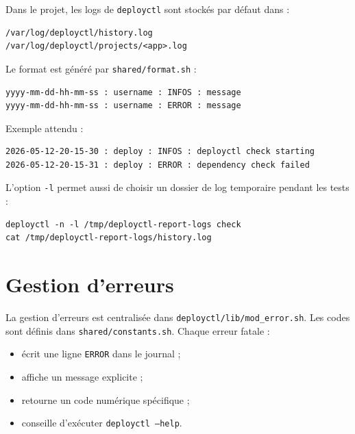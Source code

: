 \documentclass[12pt,a4paper]{article}
\begin{document}
Dans le projet, les logs de \texttt{deployctl} sont stockés par défaut dans :

\begin{lstlisting}
/var/log/deployctl/history.log
/var/log/deployctl/projects/<app>.log
\end{lstlisting}

Le format est généré par \texttt{shared/format.sh} :

\begin{lstlisting}
yyyy-mm-dd-hh-mm-ss : username : INFOS : message
yyyy-mm-dd-hh-mm-ss : username : ERROR : message
\end{lstlisting}

Exemple attendu :

\begin{lstlisting}
2026-05-12-20-15-30 : deploy : INFOS : deployctl check starting
2026-05-12-20-15-31 : deploy : ERROR : dependency check failed
\end{lstlisting}

L'option \texttt{-l} permet aussi de choisir un dossier de log temporaire pendant les tests :

\begin{lstlisting}
deployctl -n -l /tmp/deployctl-report-logs check
cat /tmp/deployctl-report-logs/history.log
\end{lstlisting}

\section{Gestion d'erreurs}

La gestion d'erreurs est centralisée dans \texttt{deployctl/lib/mod\_error.sh}. Les codes sont définis dans \texttt{shared/constants.sh}. Chaque erreur fatale :
\begin{itemize}[leftmargin=*]
  \item écrit une ligne \texttt{ERROR} dans le journal ;
  \item affiche un message explicite ;
  \item retourne un code numérique spécifique ;
  \item conseille d'exécuter \texttt{deployctl --help}.
\end{itemize}
\end{document}
